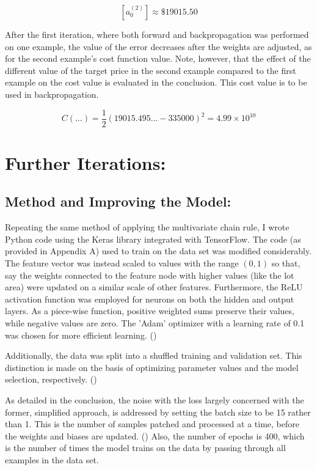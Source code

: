 \documentclass[12pt,a4paper]{article}
\begin{document}
\begin{equation}
\left[a_0^{\left(2\right)}\right] \approx \$19015.50
\end{equation}

After the first iteration, where both forward and backpropagation was performed on one example, the value of the error decreases after the weights are adjusted, as for the second example’s cost function value. Note, however, that the effect of the different value of the target price in the second example compared to the first example on the cost value is evaluated in the conclusion. This cost value is to be used in backpropagation.

\begin{equation}
C\left(\ldots\right)= \frac{1}{2}\left(19015.495... - 335000\right)^2 =  4.99 \times{10}^{10}
\end{equation}


\section{Further Iterations:}

\subsection{Method and Improving the Model:}

Repeating the same method of applying the multivariate chain rule, I wrote Python code using the Keras library integrated with TensorFlow. The code (as provided in Appendix A) used to train on the data set was modified considerably. The feature vector was instead scaled to values with the range $(0,1)$ so that, say the weights connected to the feature node with higher values (like the lot area) were updated on a similar scale of other features. Furthermore, the ReLU activation function was employed for neurons on both the hidden and output layers. As a piece-wise function, positive weighted sums preserve their values, while negative values are zero. The 'Adam' optimizer with a learning rate of 0.1 was chosen for more efficient learning. ()

Additionally, the data was split into a shuffled training and validation set. This distinction is made on the basis of optimizing parameter values and the model selection, respectively. ()

As detailed in the conclusion, the noise with the loss largely concerned with the former, simplified approach, is addressed by setting the batch size to be 15 rather than 1. This is the number of samples patched and processed at a time, before the weights and biases are updated. () Also, the number of epochs is 400, which is the number of times the model trains on the data by passing through all examples in the data set. 
\end{document}
